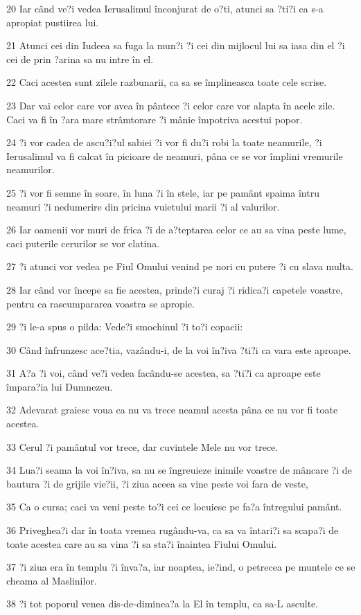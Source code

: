 \par 20 Iar când ve?i vedea Ierusalimul înconjurat de o?ti, atunci sa ?ti?i ca s-a apropiat pustiirea lui.
\par 21 Atunci cei din Iudeea sa fuga la mun?i ?i cei din mijlocul lui sa iasa din el ?i cei de prin ?arina sa nu intre în el.
\par 22 Caci acestea sunt zilele razbunarii, ca sa se împlineasca toate cele scrise.
\par 23 Dar vai celor care vor avea în pântece ?i celor care vor alapta în acele zile. Caci va fi în ?ara mare strâmtorare ?i mânie împotriva acestui popor.
\par 24 ?i vor cadea de ascu?i?ul sabiei ?i vor fi du?i robi la toate neamurile, ?i Ierusalimul va fi calcat în picioare de neamuri, pâna ce se vor împlini vremurile neamurilor.
\par 25 ?i vor fi semne în soare, în luna ?i în stele, iar pe pamânt spaima întru neamuri ?i nedumerire din pricina vuietului marii ?i al valurilor.
\par 26 Iar oamenii vor muri de frica ?i de a?teptarea celor ce au sa vina peste lume, caci puterile cerurilor se vor clatina.
\par 27 ?i atunci vor vedea pe Fiul Omului venind pe nori cu putere ?i cu slava multa.
\par 28 Iar când vor începe sa fie acestea, prinde?i curaj ?i ridica?i capetele voastre, pentru ca rascumpararea voastra se apropie.
\par 29 ?i le-a spus o pilda: Vede?i smochinul ?i to?i copacii:
\par 30 Când înfrunzesc ace?tia, vazându-i, de la voi în?iva ?ti?i ca vara este aproape.
\par 31 A?a ?i voi, când ve?i vedea facându-se acestea, sa ?ti?i ca aproape este împara?ia lui Dumnezeu.
\par 32 Adevarat graiesc voua ca nu va trece neamul acesta pâna ce nu vor fi toate acestea.
\par 33 Cerul ?i pamântul vor trece, dar cuvintele Mele nu vor trece.
\par 34 Lua?i seama la voi în?iva, sa nu se îngreuieze inimile voastre de mâncare ?i de bautura ?i de grijile vie?ii, ?i ziua aceea sa vine peste voi fara de veste,
\par 35 Ca o cursa; caci va veni peste to?i cei ce locuiesc pe fa?a întregului pamânt.
\par 36 Priveghea?i dar în toata vremea rugându-va, ca sa va întari?i sa scapa?i de toate acestea care au sa vina ?i sa sta?i înaintea Fiului Omului.
\par 37 ?i ziua era în templu ?i înva?a, iar noaptea, ie?ind, o petrecea pe muntele ce se cheama al Maslinilor.
\par 38 ?i tot poporul venea dis-de-diminea?a la El în templu, ca sa-L asculte.

